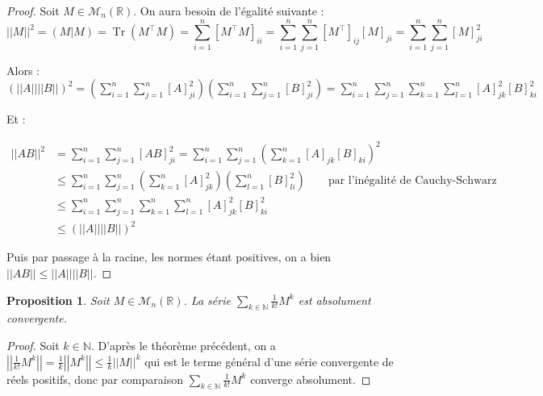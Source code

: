 \documentclass[a4paper]{article}
\newtheorem*{proposition}{Proposition}
\begin{document}
\begin{proof}

    Soit $M \in \mathcal{M}_{n}(\mathbb{R})$. On aura besoin de l'égalité suivante :
    $$\left|\left|M\right|\right|^2 = \left(M|M\right) = \operatorname{Tr}\left(M^\top M\right) = \sum_{i=1}^n \left[M^\top M\right]_{ii} = \sum_{i=1}^n\sum_{j=1}^n \left[M^\top\right]_{ij} \left[M\right]_{ji} = \sum_{i=1}^n\sum_{j=1}^n \left[M\right]_{ji}^2$$
    
    Alors : $\displaystyle \left(\left|\left|A\right|\right|\left|\left|B\right|\right|\right)^2 = \left(\sum_{i=1}^n\sum_{j=1}^n \left[A\right]_{ji}^2\right) \left(\sum_{i=1}^n\sum_{j=1}^n \left[B\right]_{ji}^2\right) = \sum_{i=1}^n  \sum_{j=1}^n  \sum_{k=1}^n  \sum_{l=1}^n \left[A\right]_{jk}^2 \left[B\right]_{ki}^2$
    
    Et :
    
    \begin{align*}
        \left|\left|AB\right|\right|^2 &= \sum_{i=1}^n  \sum_{j=1}^n \left[AB\right]_{ji}^2 = \sum_{i=1}^n  \sum_{j=1}^n \left(\sum_{k=1}^n \left[A\right]_{jk} \left[B\right]_{ki}\right)^2 \\
        & \leq \sum_{i=1}^n  \sum_{j=1}^n \left(\sum_{k=1}^n \left[A\right]_{jk}^2\right) \left(\sum_{l=1}^n \left[B\right]_{li}^2\right) \qquad \text{par l'inégalité de Cauchy-Schwarz}\\
        & \leq \sum_{i=1}^n  \sum_{j=1}^n  \sum_{k=1}^n  \sum_{l=1}^n \left[A\right]_{jk}^2 \left[B\right]_{ki}^2 \\
        & \leq \left(\left|\left|A\right|\right|\left|\left|B\right|\right|\right)^2
    \end{align*}
    
    Puis par passage à la racine, les normes étant positives, on a bien $\left|\left| AB \right|\right| \leq \left|\left| A \right|\right| \left|\left| B \right|\right|$.

    
\end{proof}

\begin{proposition}
    Soit $M \in \mathcal{M}_{n}(\mathbb{R})$. La série $\displaystyle \sum_{k \in \mathbb{N}} \frac{1}{k!}M^k$ est absolument convergente.
\end{proposition}

\begin{proof}
    Soit $k \in \mathbb{N}$. D'après le théorème précédent, on a $\displaystyle \left|\left|\frac{1}{k!}M^k\right|\right| = \frac{1}{k}\left|\left|M^k\right|\right| \leq \frac{1}{k}\left|\left|M\right|\right|^k$ qui est le terme général d'une série convergente de réels positifs, donc par comparaison $\displaystyle \sum_{k \in \mathbb{N}} \frac{1}{k!}M^k$ converge absolument.
\end{proof}
\end{document}
